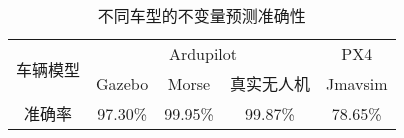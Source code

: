 \begin{table}[ht]
\caption{不同车型的不变量预测准确性}
\label{tab:check_sim}
\centering
\begin{tabular}{c|c|c|c|c}
        \toprule[1.5pt]
        \multirow{2}{*}{车辆模型}&
        \multicolumn{3}{c|}{Ardupilot} & \multicolumn{1}{c}{PX4} \\
        
        \cmidrule[0.8pt]{2-5}
        
          & Gazebo & Morse & 真实无人机 & Jmavsim \\
        
         \midrule[0.8pt]
        
         准确率  & 97.30\% & 99.95\% & 99.87\% & 78.65\% \\
        
        \bottomrule[1.5pt]
\end{tabular}
\end{table}